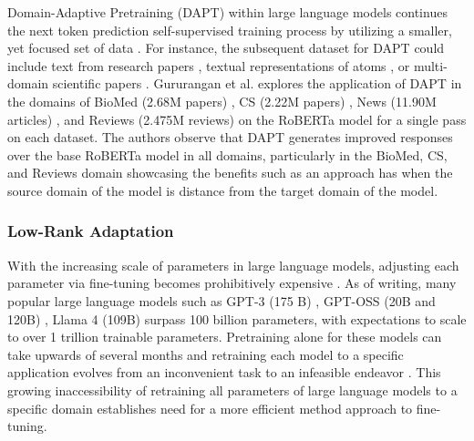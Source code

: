Domain-Adaptive Pretraining (DAPT) within large language models continues the
next token prediction self-supervised training process by utilizing a smaller,
yet focused set of data \cite{gururangan_dont_2020, ke_continual_2023,
xu_bert_2019, ke_adapting_2022}. For instance, the subsequent dataset for DAPT
could include text from research papers \cite{gururangan_dont_2020}, textual
representations of atoms \cite{ock_catalyst_2023}, or multi-domain scientific
papers \cite{beltagy_scibert_2019}. Gururangan et al.
\cite{gururangan_dont_2020} explores the application of DAPT in the domains of
BioMed (2.68M papers) \cite{lo_s2orc_2020}, CS (2.22M papers)
\cite{lo_s2orc_2020}, News (11.90M articles) \cite{zellers_defending_2019}, and
Reviews (2.475M reviews)\cite{he_ups_2016} on the RoBERTa
\cite{liu_roberta_2019} model for a single pass on each dataset. The authors
observe that DAPT generates improved responses over the base RoBERTa
\cite{liu_roberta_2019} model in all domains, particularly in the BioMed, CS, and
Reviews domain showcasing the benefits such as an approach has when the source
domain of the model is distance from the target domain of the model.


\subsubsection{Low-Rank Adaptation}
\label{sec:lora}

With the increasing scale of parameters in large language models, adjusting each
parameter via fine-tuning becomes prohibitively expensive \cite{hu_lora_2021}.
As of writing, many popular large language models such as GPT-3 (175 B)
\cite{hu_lora_2021}, GPT-OSS (20B and 120B) \cite{openai_gpt-oss-120b_2025},
Llama 4 (109B) surpass 100 billion parameters, with expectations to scale to
over 1 trillion trainable parameters\cite{fedus_switch_2022}. Pretraining alone
for these models can take upwards of several months and retraining each model to
a specific application evolves from an inconvenient task to an infeasible
endeavor \cite{hu_lora_2021}. This growing inaccessibility of retraining all
parameters of large language models to a specific domain establishes need for a
more efficient method approach to fine-tuning.

